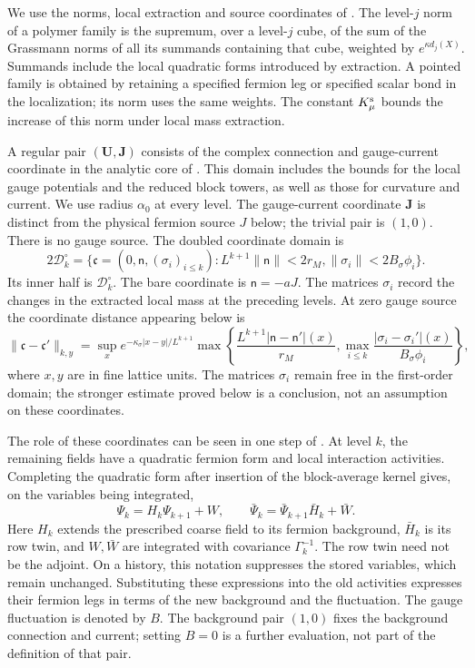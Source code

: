 \documentclass[11pt,letterpaper,reqno]{amsart}
\theoremstyle{definition}
\theoremstyle{remark}
\begin{document}
We use the norms, local extraction and source coordinates of
\cite[Prop. 10.1 and its proof]{QCDM1}.  The level-$j$ norm
of a polymer family is the supremum, over a level-$j$ cube, of
the sum of the Grassmann norms of all its summands containing
that cube, weighted by $e^{\kappa d_j(X)}$.  Summands include
the local quadratic forms introduced by extraction.  A pointed
family is obtained by retaining a specified fermion leg or
specified scalar bond in the localization; its norm uses the
same weights.  The constant $K_\mu^{\rm s}$ bounds the increase
of this norm under local mass extraction.

A regular pair $(\mathbf U,\mathbf J)$ consists of the complex
connection and gauge-current coordinate in the analytic core of
\cite[\S4]{QCDM1}. This domain includes the bounds for the
local gauge potentials and the reduced block towers, as well
as those for curvature and current. We use radius $\alpha_0$
at every level. The gauge-current coordinate $\mathbf J$ is
distinct from the physical fermion source $J$ below; the
trivial pair is $(1,0)$.
There is no gauge source.  The doubled coordinate domain is
\begin{equation}\label{eq:qcdm2-zero-source-domain}
 2\mathscr D_k^\circ
 =\{\mathfrak c=(0,\mathsf n,(\sigma_i)_{i\le k}):
       L^{k+1}\|\mathsf n\|<2r_M,
       \|\sigma_i\|<2B_\sigma\phi_i\}.
\end{equation}
Its inner half is $\mathscr D_k^\circ$.
The bare coordinate is $\mathsf n=-aJ$.
The matrices $\sigma_i$ record the changes in the extracted
local mass at the preceding levels. At zero gauge source
the coordinate distance appearing below is
\[
 \|\mathfrak c-\mathfrak c'\|_{k,y}
 =\sup_x e^{-\kappa_\sigma|x-y|/L^{k+1}}
 \max\left\{\frac{L^{k+1}|\mathsf n-\mathsf n'|(x)}{r_M},
       \max_{i\le k}\frac{|\sigma_i-\sigma_i'|(x)}{B_\sigma\phi_i}\right\},
\]
where $x,y$ are in fine lattice units.
The matrices $\sigma_i$ remain free in the first-order domain;
the stronger estimate proved below is a conclusion, not an
assumption on these coordinates.

The role of these coordinates can be seen in one step of
\cite[Prop. 10.1]{QCDM1}. At level $k$, the remaining
fields have a quadratic fermion form and local interaction
activities. Completing the quadratic form after insertion
of the block-average kernel gives, on the variables being
integrated,
\[
 \Psi_k=H_k\Psi_{k+1}+W,\qquad
 \bar\Psi_k=\bar\Psi_{k+1}\bar H_k+\bar W.
\]
Here $H_k$ extends the prescribed coarse field to its fermion
background, $\bar H_k$ is its row twin, and $W,\bar W$ are
integrated with covariance $\Gamma_k^{-1}$. The row twin
need not be the adjoint. On a history, this notation
suppresses the stored variables, which remain unchanged.
Substituting these expressions into the old activities
expresses their fermion legs in terms of the new background
and the fluctuation. The gauge fluctuation is denoted by
$B$. The background pair $(1,0)$ fixes the background
connection and current; setting $B=0$ is a further
evaluation, not part of the definition of that pair.
\end{document}
